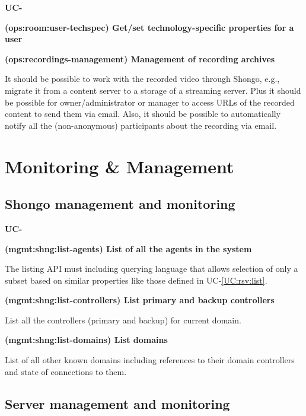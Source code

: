 \documentclass[a4paper]{report}
\makeatletter
\newcounter{UCcounter}
\newenvironment{UseCases}%
	{\begin{list}{\textbf{UC-\arabic{UCcounter}}}{\@nmbrlisttrue\def\@listctr{UCcounter}}}%
	{\end{list}}
\newcommand{\UClabel}[1]{\label{UC:#1}}
\newcommand{\UCref}[1]{UC-\ref{UC:#1}}
\newcommand{\UseCase}[2]{\item\UClabel{#2} \textbf{(#2) #1}\\ \nopagebreak}
\makeatother
\begin{document}
\begin{UseCases}
\UseCase{Get/set technology-specific properties for a
user}{ops:room:user-techspec}

\UseCase{Management of recording archives}{ops:recordings-management}

It should be possible to work with the recorded video through Shongo, e.g.,
migrate it from a content server to a storage of a streaming server. Plus it
should be possible for owner/administrator or manager to access URLs of the
recorded content to send them via email. Also, it should be possible to
automatically notify all the (non-anonymous) participants about the recording
via email.

\end{UseCases}



\section{Monitoring \& Management}

\subsection{Shongo management and monitoring}

\begin{UseCases}

\UseCase{List of all the agents in the system}{mgmt:shng:list-agents}

The listing API must including querying language that allows selection of only
a subset based on similar properties like those defined in \UCref{rsv:list}.

\UseCase{List primary and backup controllers}{mgmt:shng:list-controllers}

List all the controllers (primary and backup) for current domain.

\UseCase{List domains}{mgmt:shng:list-domains}

List of all other known domains including references to their domain
controllers and state of connections to them.

\end{UseCases}

\subsection{Server management and monitoring}
\end{document}

